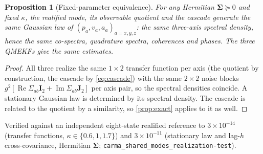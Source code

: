 \documentclass[conference]{IEEEtran}
\DeclareRobustCommand{\mat}[1]{\bm{#1}}
\renewcommand{\Re}{\operatorname{Re}}
\renewcommand{\Im}{\operatorname{Im}}
\theoremstyle{bodysmall}
\newtheorem{proposition}{Proposition}
\begin{document}
\begin{proposition}[Fixed-parameter equivalence]
\label{prop:law}
For any Hermitian $\mat\Sigma\succeq0$ and fixed $\kappa$, the realified mode,
its observable quotient and the cascade generate the same Gaussian law of
$(p_a,v_a,a_a)_{a=x,y,z}$: the same three-axis spectral density, hence the
same co-spectra, quadrature spectra, coherences and phases. The three QMEKFs
give the same estimates.
\end{proposition}
\begin{proof}
All three realize the same $1\times2$ transfer function per axis (the
quotient by construction, the cascade by \eqref{eq:cascade}) with the same
$2\times2$ noise blocks $g^2[\Re\Sigma_{ab}\mat I_2+\Im\Sigma_{ab}\mat J_2]$
per axis pair, so the spectral densities coincide. A stationary Gaussian law
is determined by its spectral density. The cascade is related to the
quotient by a similarity, so \cref{prop:exact} applies to it as well.
\end{proof}
Verified against an independent eight-state realified reference to
$3\times10^{-14}$ (transfer functions, $\kappa\in\{0.6,1,1.7\}$) and
$3\times10^{-11}$ (stationary law and lag-$h$ cross-covariance, Hermitian
$\mat\Sigma$; \texttt{carma\_shared\_modes\_realization-test}).
\end{document}
